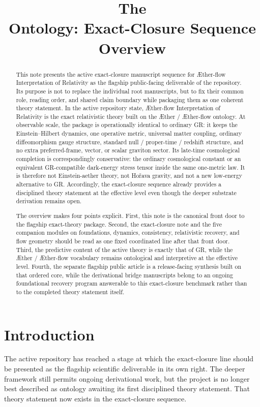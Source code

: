 \documentclass[11pt]{article}
\title{The \TheoryName{}\\[0.4em]
Ontology: Exact-Closure Sequence Overview}
\author{}
\date{}
\newcommand{\Aether}{\AE{}ther}
\newcommand{\Aflow}{\AE{}ther-flow}
\newcommand{\TheoryName}{\Aflow{} Interpretation of Relativity}
\begin{document}
\AetherFlowAPATitlePage

\begin{abstract}
This note presents the active exact-closure manuscript sequence for \TheoryName{} as the flagship public-facing deliverable of the repository. Its purpose is not to replace the individual root manuscripts, but to fix their common role, reading order, and shared claim boundary while packaging them as one coherent theory statement. In the active repository state, \TheoryName{} is the exact relativistic theory built on the \Aether{} / \Aflow{} ontology. At observable scale, the package is operationally identical to ordinary GR: it keeps the Einstein--Hilbert dynamics, one operative metric, universal matter coupling, ordinary diffeomorphism gauge structure, standard null / proper-time / redshift structure, and no extra preferred-frame, vector, or scalar graviton sector. Its late-time cosmological completion is correspondingly conservative: the ordinary cosmological constant or an equivalent GR-compatible dark-energy stress tensor inside the same one-metric law. It is therefore not Einstein-aether theory, not Ho\v{r}ava gravity, and not a new low-energy alternative to GR. Accordingly, the exact-closure sequence already provides a disciplined theory statement at the effective level even though the deeper substrate derivation remains open.

The overview makes four points explicit. First, this note is the canonical front door to the flagship exact-theory package. Second, the exact-closure note and the five companion modules on foundations, dynamics, consistency, relativistic recovery, and flow geometry should be read as one fixed coordinated line after that front door. Third, the predictive content of the active theory is exactly that of GR, while the \Aether{} / \Aflow{} vocabulary remains ontological and interpretive at the effective level. Fourth, the separate flagship public article is a release-facing synthesis built on that ordered core, while the derivational bridge manuscripts belong to an ongoing foundational recovery program answerable to this exact-closure benchmark rather than to the completed theory statement itself.
\end{abstract}

\section{Introduction}

The active repository has reached a stage at which the exact-closure line should be presented as the flagship scientific deliverable in its own right. The deeper framework still permits ongoing derivational work, but the project is no longer best described as ontology awaiting its first disciplined theory statement. That theory statement now exists in the exact-closure sequence.
\end{document}

